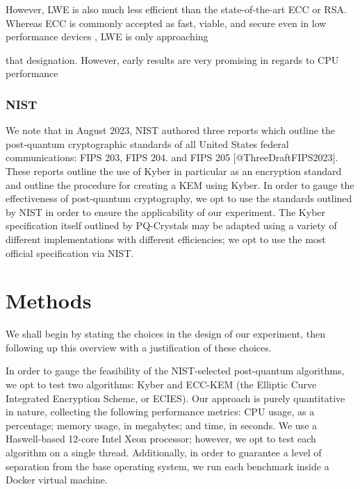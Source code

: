 \documentclass[a4paper]{article}
\begin{document}
However, LWE is also much less efficient than the state-of-the-art ECC
or RSA. Whereas ECC is commonly accepted as fast, viable, and secure
even in low performance devices
\autocite{dhillonEllipticCurveCryptography2016}, LWE is only approaching
\autocite{khalidLatticebasedCryptographyIoT2019,guillenPostquantumSecurityIoT2017,seyhanLatticebasedCryptosystemsSecurity2022}

 that designation.
However, early results are very promising in regards to CPU performance
\autocite{akleylekNewLatticebasedAuthentication2022}

\subsubsection[nist]{NIST} We note that in August 2023, NIST authored three reports
which outline the post-quantum cryptographic standards of all United
States federal communications: FIPS 203, FIPS 204. and FIPS 205
{[}@ThreeDraftFIPS2023{]}. These reports outline the use of Kyber in
particular as an encryption standard and outline the procedure for
creating a KEM using Kyber. In order to gauge the effectiveness of
post-quantum cryptography, we opt to use the standards outlined by NIST
in order to ensure the applicability of our experiment. The Kyber
specification itself outlined by PQ-Crystals may be adapted using a
variety of different implementations with different efficiencies; we opt
to use the most official specification via NIST.

\section{Methods}\label{methods}

We shall begin by stating the choices in the design of our experiment,
then following up this overview with a justification of these choices.

In order to gauge the feasibility of the NIST-selected post-quantum
algorithms, we opt to test two algorithms: Kyber and ECC-KEM (the
Elliptic Curve Integrated Encryption Scheme, or ECIES). Our approach is
purely quantitative in nature, collecting the following performance
metrics: CPU usage, as a percentage; memory usage, in megabytes; and
time, in seconds. We use a Haswell-based 12-core Intel Xeon processor;
however, we opt to test each algorithm on a single thread. Additionally,
in order to guarantee a level of separation from the base operating
system, we run each benchmark inside a Docker virtual machine.
\end{document}
